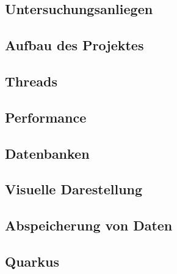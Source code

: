 \begin{spacing}{1}
    \section{Untersuchungsanliegen}\label{section:untersuchungsanliegenFlexlogger}
    \end{spacing}


\begin{spacing}{1}
    \section{Aufbau des Projektes}\label{section:aufbaudesProjektesFlexlogger}
    \end{spacing}


\begin{spacing}{1}
    \section{Threads}\label{section:threads}
    \end{spacing}


\begin{spacing}{1}
    \section{Performance}\label{section:performance}
    \end{spacing}


\begin{spacing}{1}
    \section{Datenbanken}\label{section:database}
    \end{spacing}


\begin{spacing}{1}
    \section{Visuelle Darestellung}\label{section:gui}
    \end{spacing}



\begin{spacing}{1}
    \section{Abspeicherung von Daten}\label{section:savedata}
    \end{spacing}


\begin{spacing}{1}
    \section{Quarkus}\label{section:quarkus}
    \end{spacing}
